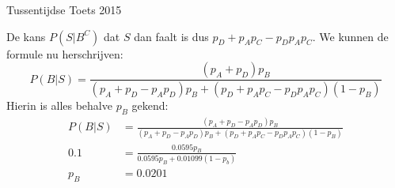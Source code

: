 \documentclass[main.tex]{subfiles}
\begin{document}
\begin{examenvraag}{Tussentijdse Toets 2015}
\begin{ex-antwoord}
\begin{itemize}
      De kans $P(S|B^{C})$ dat $S$ dan faalt is dus $p_{D} + p_{A}p_{C} - p_{D}p_{A}p_{C}$.
      We kunnen de formule nu herschrijven:
      \[ P(B|S) = \frac{(p_{A}+p_{D})p_{B}}{(p_{A}+p_{D}-p_{A}p_{D})p_{B} + (p_{D} + p_{A}p_{C} - p_{D}p_{A}p_{C})(1-p_{B})} \]
      Hierin is alles behalve $p_{B}$ gekend:
      \begin{align*}
        P(B|S) &= \frac{(p_{A}+p_{D}-p_{A}p_{D})p_{B}}{(p_{A}+p_{D}-p_{A}p_{D})p_{B} + (p_{D} + p_{A}p_{C} -p_{D}p_{A}p_{C})(1-p_{B})}\\
        0.1 &= \frac{0.0595 p_{B}}{ 0.0595 p_{B} + 0.01099(1-p_{b})}\\
        p_{B} &= 0.0201
      \end{align*}
    \end{itemize}
  \end{ex-antwoord}
\end{examenvraag}
\end{document}
